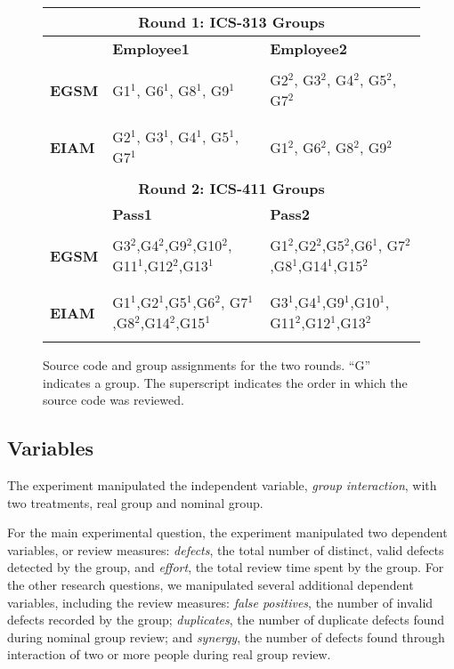 \begin{figure}[htb]
    \small
  \begin{center}
    \begin{tabular} {|l|p{1.2in}|p{1.2in}|}
      \multicolumn{3}{c}{{\bf Round 1: ICS-313 Groups}}\\
      \hline
      & {\bf Employee1} & {\bf Employee2}\\
      \hline
      & & \\
      {\bf EGSM} & G1$^1$, G6$^1$, G8$^1$, G9$^1$ & G2$^2$, G3$^2$, G4$^2$, G5$^2$, G7$^2$ \\
      & & \\
      \hline
      & & \\
      {\bf EIAM} & G2$^1$, G3$^1$, G4$^1$, G5$^1$, G7$^1$ & G1$^2$, G6$^2$, G8$^2$, G9$^2$ \\
      & &  \\
      \hline
      \multicolumn{3}{c}{{\bf Round 2: ICS-411 Groups}}\\
      \hline
      & {\bf Pass1} & {\bf Pass2}\\
      \hline
      & & \\
      {\bf EGSM} & G3$^2$,G4$^2$,G9$^2$,G10$^2$, G11$^1$,G12$^2$,G13$^1$ & G1$^2$,G2$^2$,G5$^2$,G6$^1$, G7$^2$,G8$^1$,G14$^1$,G15$^2$\\
      & & \\
      \hline
      & & \\
      {\bf EIAM} & G1$^1$,G2$^1$,G5$^1$,G6$^2$,
      G7$^1$,G8$^2$,G14$^2$,G15$^1$ & G3$^1$,G4$^1$,G9$^1$,G10$^1$, G11$^2$,G12$^1$,G13$^2$ \\
      & &  \\
      \hline
     \end{tabular}
  \end{center}
  \caption{Source code and group assignments for the two rounds. ``G''
  indicates a group. The
  superscript indicates the order in which the source code was reviewed.}
  \label{design}
  \normalsize
\end{figure}

\subsection{Variables}

The experiment manipulated the independent variable, {\em group interaction},
with two treatments, real group and nominal group. 

For the main experimental question, the experiment manipulated two
dependent variables, or review measures: {\em defects}, the total number of
distinct, valid defects detected by the group, and {\em effort}, the total
review time spent by the group.  For the other research questions, we
manipulated several additional dependent variables, including the review
measures: {\em false positives}, the number of invalid defects recorded by
the group; {\em duplicates}, the number of duplicate defects found during
nominal group review; and {\em synergy}, the number of defects found
through interaction of two or more people during real group review.

